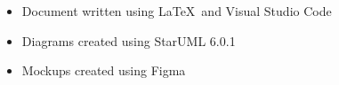 \clearpage
{}
\label{sect:effort}



\clearpage
{}


\begin{itemize}
        \item Document written using \LaTeX  \ and Visual Studio Code
        \item Diagrams created using StarUML 6.0.1
        \item Mockups created using Figma
\end{itemize}

